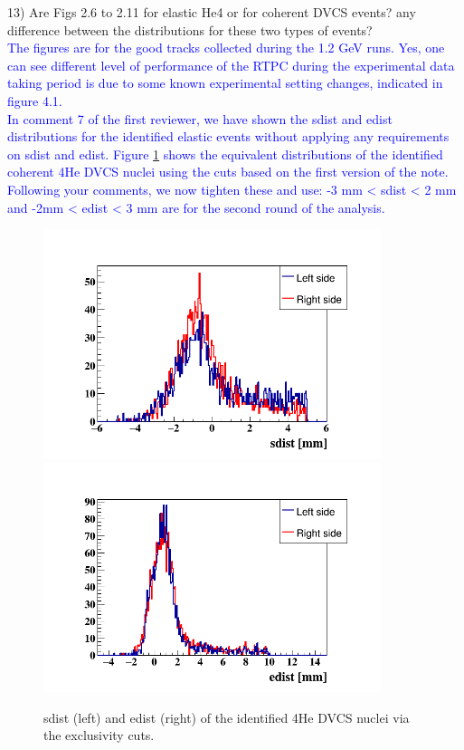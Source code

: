 13) Are Figs 2.6 to 2.11 for elastic He4 or for coherent DVCS events? any 
difference between the distributions for these two types of events?\\
\textcolor{blue}{ The figures are for the good tracks collected during the 1.2 
GeV runs. Yes, one can see different level of performance of the RTPC during 
the experimental data taking period is due to some known experimental setting 
changes, indicated in figure 4.1.}\\
\textcolor{blue}{ In comment 7 of the first reviewer, we have shown the sdist 
   and edist distributions for the identified elastic events without applying 
   any requirements on sdist and edist. Figure \ref{fig:dvcs_coh_sdist_edist} 
   shows the equivalent distributions of the identified coherent 4He DVCS 
   nuclei using the cuts based on the first version of the note.
   Following your comments, we now tighten these and use: -3 mm < sdist < 2 mm 
   and -2mm < edist < 3 mm are for the second round of the analysis. }\\ 

\begin{figure}[tbp]
   \hspace{-1.0cm}
   \includegraphics[height=6.7cm]{fig/coh_rtpc_sdist.png}
\includegraphics[height=6.7cm]{fig/coh_rtpc_edist.png}
\caption{sdist (left) and edist (right) of the identified 4He DVCS nuclei via 
the exclusivity cuts.}
\label{fig:dvcs_coh_sdist_edist}
 \end{figure}


